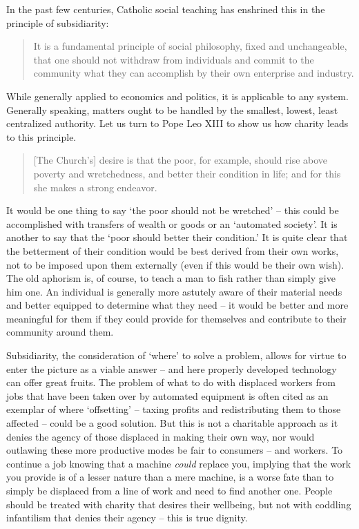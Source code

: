 \documentclass[letterpaper]{article}
\begin{document}
    In the past few centuries, Catholic social teaching has enshrined this in the principle of subsidiarity:

    \begin{quote}
      It is a fundamental principle of social philosophy, fixed and unchangeable, that one should not withdraw from individuals and commit to the community what they can accomplish by their own enterprise and industry.
    \end{quote}

    While generally applied to economics and politics, it is applicable to any system. Generally speaking, matters ought to be handled by the smallest, lowest, least centralized authority. Let us turn to Pope Leo XIII to show us how charity leads to this principle.

    \begin{quote}
      [The Church's] desire is that the poor, for example, should rise above poverty and wretchedness, and better their condition in life; and for this she makes a strong endeavor.
    \end{quote}

    It would be one thing to say `the poor should not be wretched' -- this could be accomplished with transfers of wealth or goods or an `automated society'. It is another to say that the `poor should better their condition.'  It is quite clear that the betterment of their condition would be best derived from their own works, not to be imposed upon them externally (even if this would be their own wish). The old aphorism is, of course, to teach a man to fish rather than simply give him one. An individual is generally more astutely aware of their material needs and better equipped to determine what they need -- it would be better and more meaningful for them if they could provide for themselves and contribute to their community around them.

    Subsidiarity, the consideration of `where' to solve a problem, allows for virtue to enter the picture as a viable answer -- and here properly developed technology can offer great fruits. The problem of what to do with displaced workers from jobs that have been taken over by automated equipment is often cited as an exemplar of where `offsetting' -- taxing profits and redistributing them to those affected -- could be a good solution. But this is not a charitable approach as it denies the agency of those displaced in making their own way, nor would outlawing these more productive modes be fair to consumers -- and workers. To continue a job knowing that a machine \textit{could} replace you, implying that the work you provide is of a lesser nature than a mere machine, is a worse fate than to simply be displaced from a line of work and need to find another one. People should be treated with charity that desires their wellbeing, but not with coddling infantilism that denies their agency -- this is true dignity.
\end{document}
